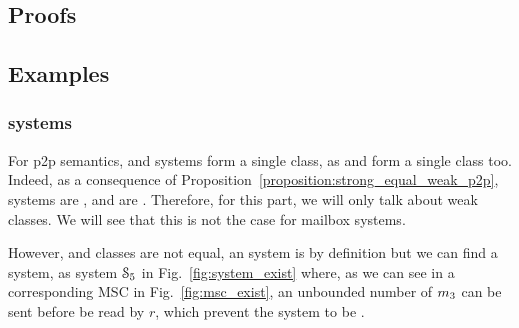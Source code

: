 


\subsection{Proofs}
\label{app:stronglykp2p}
%




\synchroinexists*


\weakuniveruweak*




\subsection{Examples}





\subsubsection{\pp systems }
For p2p semantics,
\wS{} and \sS{} systems form a single class, as  and  form a single class too.
Indeed, as a consequence of Proposition~\ref{proposition:strong_equal_weak_p2p},   systems are , and \wS{} are \sS{}.
Therefore, for this \pp part, we will only talk about weak classes.
We will see that this is not the case for mailbox systems.

However, \ub{} and \eb{} classes are not equal, an \ub{} system is \eb{} by definition but we can find a \eb{} system, as system $\mathcal{S}_{5}$ in Fig.~\ref{fig:system_exist} where, as we can see in a corresponding MSC in Fig.~\ref{fig:msc_exist}, an unbounded number of $m_3$ can be sent before be read by $r$, which prevent the system to be \ub{}.

\begin{center}
    
% 
 \end{center}


